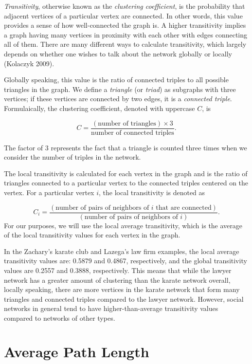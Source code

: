 \documentclass[12pt,twoside]{amherstthesis}
\begin{document}
  \emph{Transitivity}, otherwise known as the \emph{clustering
  coefficient}, is the probability that adjacent vertices of a particular
  vertex are connected. In other words, this value provides a sense of how
  well-connected the graph is. A higher transitivity implies a graph
  having many vertices in proximity with each other with edges connecting
  all of them. There are many different ways to calculate transitivity,
  which largely depends on whether one wishes to talk about the network
  globally or locally (Kolaczyk 2009).
  
  Globally speaking, this value is the ratio of connected triples to all
  possible triangles in the graph. We define a \emph{triangle} (or
  \emph{triad}) as subgraphs with three vertices; if these vertices are
  connected by two edges, it is a \emph{connected triple}. Formulaically,
  the clustering coefficient, denoted with uppercase \(C\), is
  
  \[C = \frac {(\text{number of triangles}) \times 3} {\text{number of connected triples}}.\]
  
  The factor of \(3\) represents the fact that a triangle is counted three
  times when we consider the number of triples in the network.
  
  The local transitivity is calculated for each vertex in the graph and is
  the ratio of triangles connected to a particular vertex to the connected
  triples centered on the vertex. For a particular vertex \(i\), the local
  transitivity is denoted as
  
  \[ C_{i} = \frac {(\text{number of pairs of neighbors of } i \text{ that are connected})} {(\text{number of pairs of neighbors of } i)}.\]
  For our purposes, we will use the local average transitivity, which is
  the average of the local transitivity values for each vertex in the
  graph.
  
  In the Zachary's karate club and Lazega's law firm examples, the local
  average transitivity values are: 0.5879 and 0.4867, respectively, and
  the global transitivity values are 0.2557 and 0.3888, respectively. This
  means that while the lawyer network has a greater amount of clustering
  than the karate network overall, locally speaking, there are more
  vertices in the karate network that form many triangles and connected
  triples compared to the lawyer network. However, social networks in
  general tend to have higher-than-average transitivity values compared to
  networks of other types.
  
  \section{Average Path Length}\label{average-path-length}
  
\end{document}
